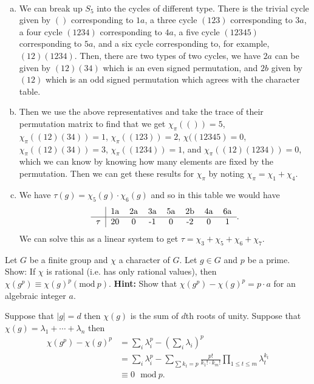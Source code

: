 \documentclass[leqno]{article}
\begin{document}
\begin{solution}~
\begin{enumerate}[(a)]
    \item We can break up $S_5$ into the cycles of different type. There is the trivial cycle given by $()$ corresponding to $1a$, a three cycle $(123)$ corresponding to $3a$, a four cycle $(1234)$ corresponding to $4a$, a five cycle $(12345)$ corresponding to $5a$, and a six cycle corresponding to, for example, $(12)(1234)$. Then, there are two types of two cycles, we have $2a$ can be given by $(12)(34)$ which is an even signed permutation, and $2b$ given by $(12)$ which is an odd signed permutation which agrees with the character table.
    
    \item Then we use the above representatives and take the trace of their permutation matrix to find that we get $\chi_\pi(())=5$, $\chi_\pi((12)(34))=1$, $\chi_\pi((123))=2$, $\chi((12345)=0$, $\chi_\pi((12)(34))=3$, $\chi_\pi((1234))=1$, and $\chi_\pi((12)(1234))=0$, which we can know by knowing how many elements are fixed by the permutation. Then we can get these results for $\chi_\pi$ by noting $\chi_\pi = \chi_1 + \chi_4$.
    
    \item We have $\tau(g)=\chi_5(g)\cdot \chi_6(g)$ and so in this table we would have 
    \[
    \begin{tabular}{c|cccccccc}
        ~ & 1a & 2a & 3a & 5a & 2b & 4a & 6a  \\
        \hline
        $\tau$ & 20 & 0 & -1 & 0 & -2 & 0  & 1 
    \end{tabular}.
    \]
    We can solve this as a linear system to get $\tau = \chi_3 + \chi_5 + \chi_6 + \chi_7$.
\end{enumerate}
\end{solution}


\newpage
\begin{problem}
Let $G$ be a finite group and $\chi$ a character of $G$. Let $g\in G$ and $p$ be a prime. Show: If $\chi$ is rational (i.e. has only rational values), then $\chi(g^p)\equiv \chi(g)^p (\textrm{mod}~p)$. \textbf{Hint:} Show that $\chi(g^p)-\chi(g)^p=p\cdot a$ for an algebraic integer $a$.
\end{problem}
\begin{solution}
    Suppose that $|g|=d$ then $\chi(g)$ is the sum of $d$th roots of unity.  Suppose that $\chi(g)=\lambda_1 + \cdots + \lambda_n$ then
    \begin{align*}
        \chi(g^p)-\chi(g)^p &= \sum_{i} \lambda_i^p - \left( \sum_{i} \lambda_i\right)^p\\
        &= \sum_{i} \lambda_i^p - \sum_{\sum k_t = p} \frac{p!}{k_1!\cdot k_m!} \prod_{1\leq t \leq m} \lambda_t^{k_t}\\
        &\equiv 0 \textrm{~ mod}~ p.
    \end{align*}
\end{solution}
\end{document}
